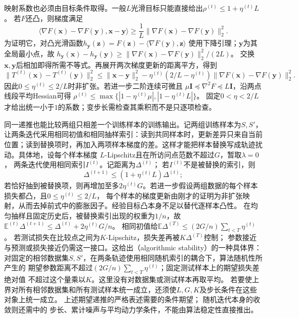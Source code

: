 映射系数也必须由目标条件取得。一般$L$光滑目标只能直接给出$\rho^{(t)}\leq1+\eta^{(t)}L$。
若$F$还凸，则梯度满足
\[
 \langle\nabla F(\bm x)-\nabla F(\bm y),\bm x-\bm y\rangle
 \geq\frac1L\|\nabla F(\bm x)-\nabla F(\bm y)\|_2^2.
\]
为证明它，对凸光滑函数$h_{\bm y}(\bm z)=F(\bm z)-\langle\nabla F(\bm y),\bm z\rangle$
使用下降引理；$\bm y$为其全局最小点，故
$h_{\bm y}(\bm x)-h_{\bm y}(\bm y)\geq
\|\nabla F(\bm x)-\nabla F(\bm y)\|_2^2/(2L)$。
交换$\bm x,\bm y$后相加即得所需不等式。再展开两次梯度更新的距离平方，得到
\[
 \|T^{(t)}(\bm x)-T^{(t)}(\bm y)\|_2^2
 \leq\|\bm x-\bm y\|_2^2
 -\eta^{(t)}(2/L-\eta^{(t)})\|\nabla F(\bm x)-\nabla F(\bm y)\|_2^2.
\]
因此$0\leq\eta^{(t)}\leq2/L$时非扩张。若进一步二阶连续可微且
$\mu\bm I\preceq\nabla^2F\preceq L\bm I$，沿两点线段平均Hessian可得
$\rho^{(t)}\leq\max\{|1-\eta^{(t)}\mu|,|1-\eta^{(t)}L|\}$。
固定$0<\eta<2/L$才给出统一小于$1$的系数；变步长需检查其乘积而不是只逐项检查。

同一递推也能比较两组只相差一个训练样本的训练输出。记两组训练样本为$S,S'$，让两条迭代采用相同初值和相同抽样索引：读到共同样本时，更新差异只来自当前位置；读到替换项时，再加入两项样本梯度的差。这样才能把样本替换写成轨迹扰动。具体地，设每个样本梯度
$L$-Lipschitz且在所访问点范数不超过$G$，暂取$\lambda=0$，
两条迭代使用相同索引$I^{(t)}$。记距离为$\Delta^{(t)}$；
若$I^{(t)}$不是被替换的索引，则
\[
  \Delta^{(t+1)}\leq(1+\eta^{(t)}L)\Delta^{(t)};
\]
若恰好抽到被替换项，则再增加至多$2\eta^{(t)}G$。若进一步假设两组数据的每个样本损失都凸，且$0\leq\eta^{(t)}\leq2/L$，
每个样本的梯度更新由刚才的证明为非扩张映射，从而去掉前式中的膨胀因子。经验目标凸本身不足以替代逐样本凸性。
在均匀抽样且固定历史后，被替换索引出现的权重为$1/n$，故
$\mathbb E^{(t)}\Delta^{(t+1)}\leq\Delta^{(t)}+2\eta^{(t)}G/n$。
相同初值给$\mathbb E\Delta^{(T)}\leq(2G/n)\sum_{t<T}\eta^{(t)}$。
若测试损失在比较点之间为$K$-Lipschitz，损失差再被$K\Delta^{(T)}$控制；
参数接近与预测或损失接近仍需这一接口。这给出（algorithmic stability）的一种具体界：
对固定的相邻数据集$S,S'$，在两条轨迹使用相同随机索引的耦合下，算法随机性所产生的
期望参数距离不超过$(2G/n)\sum_{t<T}\eta^{(t)}$；固定测试样本上的期望损失差绝对值
不超过这个量乘以$K$。这里没有对数据集或测试样本再取平均。
若要使上界对所有相邻数据集和所有测试样本统一成立，还须使$L,G,K$及步长条件在这些对象上统一成立。
上述期望递推的严格表述需要的条件期望；
随机迭代本身的收敛则还需中的
步长、累计噪声与平均动力学条件，不能由算法稳定性直接推出。


